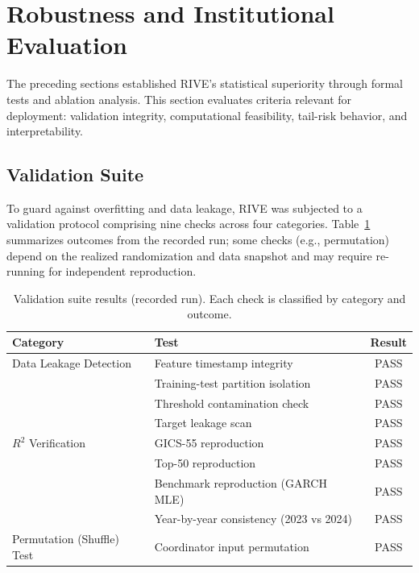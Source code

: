 \documentclass[review]{elsarticle}
\begin{document}
\section{Robustness and Institutional Evaluation}\label{sec:robustness}

The preceding sections established RIVE's statistical superiority through formal tests and ablation analysis. This section evaluates criteria relevant for deployment: validation integrity, computational feasibility, tail-risk behavior, and interpretability. %

\subsection{Validation Suite}\label{sec:validation-suite}

To guard against overfitting and data leakage, RIVE was subjected to a validation protocol comprising nine checks across four categories. Table~\ref{tab:validation-suite} summarizes outcomes from the recorded run; some checks (e.g., permutation) depend on the realized randomization and data snapshot and may require re-running for independent reproduction. %

\begin{table}[H]
\centering
\caption{Validation suite results (recorded run). Each check is classified by category and outcome.} %
\label{tab:validation-suite}
\begin{tabular}{llc}
\toprule
Category & Test & Result \\
\midrule
Data Leakage Detection & Feature timestamp integrity & PASS \\
 & Training-test partition isolation & PASS \\
 & Threshold contamination check & PASS \\
 & Target leakage scan & PASS \\
\midrule
$R^2$ Verification & GICS-55 reproduction & PASS \\
 & Top-50 reproduction & PASS \\
 & Benchmark reproduction (GARCH MLE) & PASS \\
 & Year-by-year consistency (2023 vs 2024) & PASS \\ %
\midrule
Permutation (Shuffle) Test & Coordinator input permutation & PASS \\
\bottomrule
\end{tabular}
\end{table}
\end{document}
